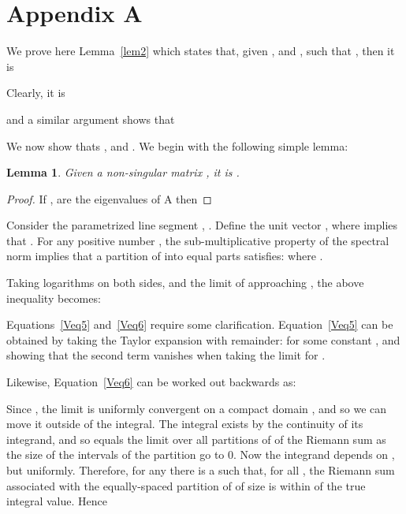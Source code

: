 \documentclass[11pt]{article}
\newtheorem{lemma}[theorem]{Lemma}
\begin{document}
\newpage




\section*{Appendix A}

We prove here Lemma~\ref{lem2} which states that, given , and , 
	such that , then it is 
	 
	 
	 
Clearly, it is

and a similar argument shows that 

We now show thats , and .
We begin with the following simple lemma: 


\begin{lemma}\label{lem:rhom}
	Given a non-singular matrix , it is . 
\end{lemma}
\begin{proof}
	If ,  are the eigenvalues of A then
		
\end{proof}
\vspace*{0.1in}





Consider the parametrized line segment , . Define the unit vector , where  implies that . 
For any positive number , the sub-multiplicative property of the spectral norm implies that a partition of  into  equal parts satisfies: 
where . 

Taking logarithms on both sides, and the limit of  approaching , the above inequality becomes:


Equations~\ref{Veq5} and~\ref{Veq6} require some clarification. 
Equation~\ref{Veq5} can be obtained by taking the Taylor expansion with remainder:
	 for some constant , and showing that the second term vanishes when taking the limit for . 

Likewise, Equation~\ref{Veq6} can be worked out backwards as:

Since , the limit is uniformly convergent on a compact domain , and so
we can move it outside of the integral. 
The integral exists by the continuity of its integrand, and so equals the limit over all partitions of
 of the Riemann sum as the size of the intervals of the partition go to 0.
Now the integrand depends on , but uniformly. 
Therefore, for any  there is a  such that, for all , 
	the Riemann sum associated with the equally-spaced partition of  of size  is within  of the true integral value. 
Hence 
\end{document}
